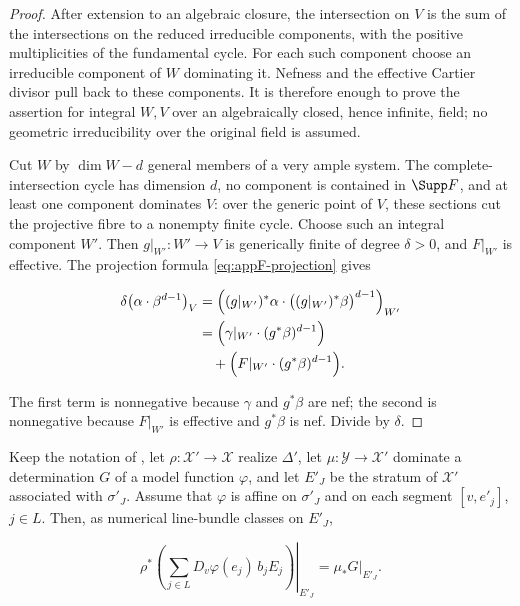 \begin{proof}
After extension to an algebraic closure, the intersection on $V$ is the
sum of the intersections on the reduced irreducible components, with the
positive multiplicities of the fundamental cycle.  For each such component
choose an irreducible component of $W$ dominating it.  Nefness and the
effective Cartier divisor pull back to these components.  It is therefore
enough to prove the assertion for integral $W,V$ over an algebraically
closed, hence infinite, field; no geometric irreducibility over the original
field is assumed.

Cut $W$ by $\dim W-d$ general members of a very ample system.  The
complete-intersection cycle has dimension $d$, no component is contained
in $\Supp F$, and at least one component dominates $V$: over the generic
point of $V$, these sections cut the projective fibre to a nonempty finite
cycle.  Choose such an integral component $W'$.  Then
$g|_{W'}:W'\to V$ is generically finite of degree $\delta>0$, and
$F|_{W'}$ is effective.  The projection formula
\eqref{eq:appF-projection} gives

\[
 \begin{aligned}
 \delta\bigl(\alpha\cdot\beta^{d-1}\bigr)_V
 &=\Bigl((g|_{W'})^*\alpha\cdot
    \bigl((g|_{W'})^*\beta\bigr)^{d-1}\Bigr)_{W'}\\
 &=\Bigl(\gamma|_{W'}\cdot(g^*\beta)^{d-1}\Bigr)\\
 &\quad+\Bigl(F|_{W'}\cdot(g^*\beta)^{d-1}\Bigr).
 \end{aligned}
\]

The first term is nonnegative because $\gamma$ and $g^*\beta$ are nef;
the second is nonnegative because $F|_{W'}$ is effective and
$g^*\beta$ is nef.  Divide by $\delta$.
\end{proof}

\begin{lemma}
\label{lem:ch22-restriction-identity}
Keep the notation of , let
$\rho:\mathcal X'\to\mathcal X$ realize $\Delta'$, let
$\mu:\mathcal Y\to\mathcal X'$ dominate a determination $G$ of a model
function $\varphi$, and let $E'_J$ be the stratum of $\mathcal X'$
associated with $\sigma'_J$.  Assume that $\varphi$ is affine on
$\sigma'_J$ and on each segment $[v,e'_j]$, $j\in L$.  Then, as
numerical line-bundle classes on $E'_J$,

\[
 \left.
 \rho^*\!\left(\sum_{j\in L}D_v\varphi(e_j)\,b_jE_j\right)
 \right|_{E'_J}
       =\left.\mu_*G\right|_{E'_J}.
\tag{22.40}\label{eq:ch22-slope-divisor-identity}
\]
\end{lemma}

